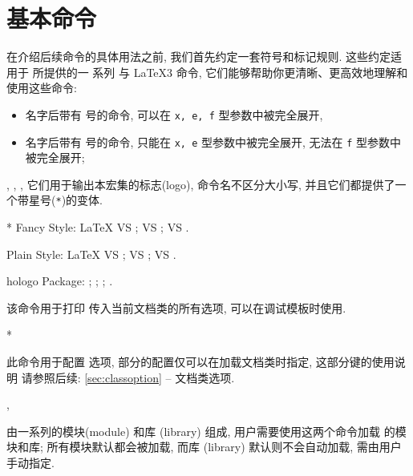 \clearpage
{}
\section{基本命令}
在介绍后续命令的具体用法之前, 我们首先约定一套符号和标记规则. 这些约定适用于 \ztex{} 所提供的一
系列  与 \LaTeX3 命令, 它们能够帮助你更清晰、更高效地理解和使用这些命令:
\begin{itemize}
  \item 名字后带有 \zFullExp{} 号的命令, 可以在 \texttt{x, e, f} 型参数中被完全展开,
  \item 名字后带有 \zResExp{} 号的命令, 只能在 \texttt{x, e} 型参数中被完全展开, 无法在 \texttt{f} 型参数中被完全展开;
\end{itemize}


\begin{function}[updated=2024-11-05]{\zTeX, \ztex, \zLaTeX, \zlatex}
它们用于输出本宏集的标志(logo), 命令名不区分大小写, 并且它们都提供了一个带星号(\texttt{*})的变体.
\end{function}
\begin{DocExample}*
Fancy Style: \LaTeX{} VS \zLaTeX{}; \zLaTeX{} VS \zlatex{}; \zTeX{} VS \ztex{}.

Plain Style: \LaTeX{} VS \zLaTeX*{}; \zLaTeX*{} VS \zlatex*{}; \zTeX*{} VS \ztex*{}.

hologo Package: ; ; ; .
\end{DocExample}


\begin{function}[updated=2025-04-25]{\ztexoption}
  \begin{syntax}
  \end{syntax}
  该命令用于打印 \ztex{} 传入当前文档类的所有选项, 可以在调试模板时使用.
\end{function}
\begin{DocExample}*
  \ztexoption
\end{DocExample}


\begin{function}[updated=2025-04-25]{\ztexset}
  \begin{syntax}
  \end{syntax}
  此命令用于配置 \ztex{} 选项, 部分的配置仅可以在加载文档类时指定, 这部分键的使用说明
  请参照后续: \cref{sec:classoption} -- 文档类选项.
\end{function}


\begin{function}[updated=2025-04-25]{\ztexloadmod, \ztexloadlib}
  \begin{syntax}
  \end{syntax}
  \ztex{} 由一系列的模块(module) 和库 (library) 组成, 用户需要使用这两个命令加载 \ztex{} 的模块和库;
  所有模块默认都会被加载, 而库 (library) 默认则不会自动加载, 需由用户手动指定.
\end{function}


